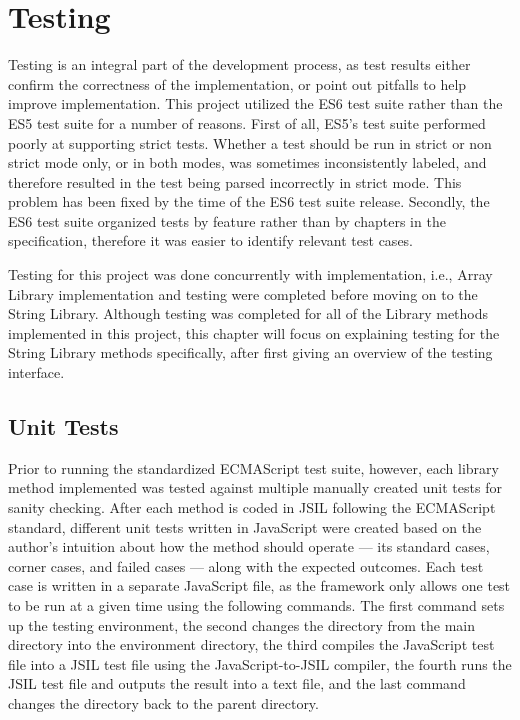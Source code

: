 \documentclass[a4paper,11pt,twoside]{report}
\begin{document}
\chapter{Testing}
Testing is an integral part of the development process, as test results either confirm the correctness of the implementation, or point out pitfalls to help improve implementation. This project utilized the ES6 test suite rather than the ES5 test suite for a number of reasons. First of all, ES5's test suite performed poorly at supporting strict tests. Whether a test should be run in strict or non strict mode only, or in both modes, was sometimes inconsistently labeled, and therefore resulted in the test being parsed incorrectly in strict mode. This problem has been fixed by the time of the ES6 test suite release. Secondly, the ES6 test suite organized tests by feature rather than by chapters in the specification, therefore it was easier to identify relevant test cases.

Testing for this project was done concurrently with implementation, i.e., Array Library implementation and testing were completed before moving on to the String Library. Although testing was completed for all of the Library methods implemented in this project, this chapter will focus on explaining testing for the String Library methods specifically, after first giving an overview of the testing interface.

\section{Unit Tests}
Prior to running the standardized ECMAScript test suite, however, each library method implemented was tested against multiple manually created unit tests for sanity checking. After each method is coded in JSIL following the ECMAScript standard, different unit tests written in JavaScript were created based on the author's intuition about how the method should operate --- its standard cases, corner cases, and failed cases --- along with the expected outcomes. Each test case is written in a separate JavaScript file, as the framework only allows one test to be run at a given time using the following commands. The first command sets up the testing environment, the second changes the directory from the main directory into the environment directory, the third compiles the JavaScript test file into a JSIL test file using the JavaScript-to-JSIL compiler, the fourth runs the JSIL test file and outputs the result into a text file, and the last command changes the directory back to the parent directory.
\end{document}
